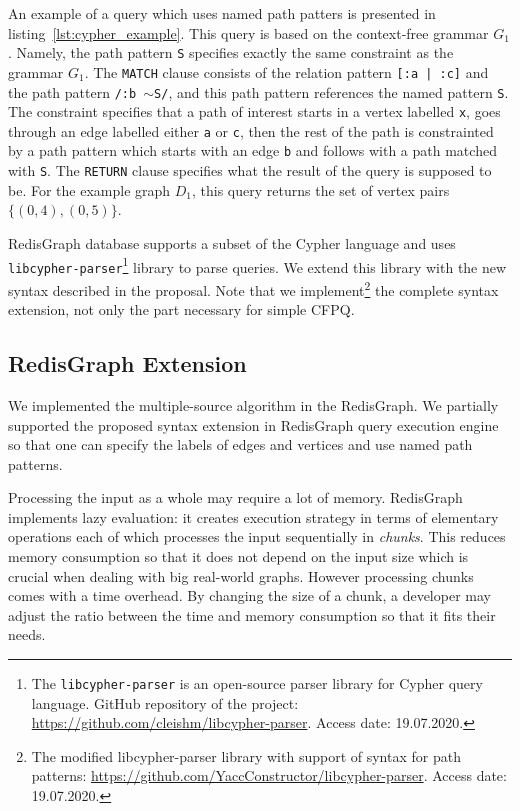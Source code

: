 An example of a query which uses named path patters is presented in listing~\ref{lst:cypher_example}.
This query is based on the context-free grammar $G_1$.
Namely, the path pattern \texttt{S} specifies exactly the same constraint as the grammar $G_1$.
The \texttt{MATCH} clause consists of the relation pattern \texttt{[:a | :c]} and the path pattern \texttt{/:b $\sim$S/}, and this path pattern references the named pattern \texttt{S}.
The constraint specifies that a path of interest starts in a vertex labelled \texttt{x}, goes through an edge labelled either \texttt{a} or \texttt{c}, then the rest of the path is constrainted by a path pattern which starts with an edge \texttt{b} and follows with a path matched with \texttt{S}.
The \texttt{RETURN} clause specifies what the result of the query is supposed to be.
For the example graph $D_1$, this query returns the set of vertex pairs $\{(0, 4), (0, 5)\}$.

RedisGraph database supports a subset of the Cypher language and uses \texttt{libcypher-parser}\footnote{The \texttt{libcypher-parser} is an open-source parser library for Cypher query language. GitHub repository of the project: \url{https://github.com/cleishm/libcypher-parser}. Access date: 19.07.2020.} library to parse queries.
We extend this library with the new syntax described in the proposal.
Note that we implement\footnote{The modified libcypher-parser library with support of syntax for path patterns: \url{https://github.com/YaccConstructor/libcypher-parser}. Access date: 19.07.2020.} the complete syntax extension, not only the part necessary for simple CFPQ.

\subsection{RedisGraph Extension}

We implemented the multiple-source algorithm in the RedisGraph.
We partially supported the proposed syntax extension in RedisGraph query execution engine so that one can specify the labels of edges and vertices and use named path patterns.

Processing the input as a whole may require a lot of memory.
RedisGraph implements lazy evaluation: it creates execution strategy in terms of elementary operations each of which processes the input sequentially in \emph{chunks}.
This reduces memory consumption so that it does not depend on the input size which is crucial when dealing with big real-world graphs.
However processing chunks comes with a time overhead.
By changing the size of a chunk, a developer may adjust the ratio between the time and memory consumption so that it fits their needs.

